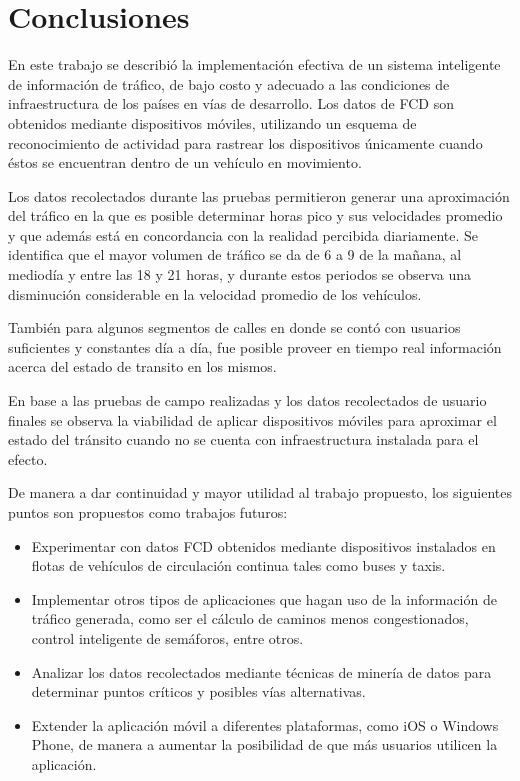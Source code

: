 \section{Conclusiones}
\label{sec:conclusiones}

En este trabajo se describió la implementación efectiva de un sistema inteligente de información de tráfico, de bajo costo y adecuado a las condiciones de infraestructura de los países en vías de desarrollo. Los datos de FCD son obtenidos mediante dispositivos móviles, utilizando un esquema de reconocimiento de actividad para rastrear los dispositivos únicamente cuando éstos se encuentran dentro de un vehículo en movimiento.

Los datos recolectados durante las pruebas permitieron generar una aproximación del tráfico en la que es posible determinar horas pico y sus velocidades promedio y que además está en concordancia con la realidad percibida diariamente. Se identifica que el mayor volumen de tráfico se da de 6 a 9 de la mañana, al mediodía y entre las 18 y 21 horas, y durante estos periodos se observa una disminución considerable en la velocidad promedio de los vehículos.

También para algunos segmentos de calles en donde se contó con usuarios suficientes y constantes día a día, fue posible proveer en tiempo real información acerca del estado de transito en los mismos.

En base a las pruebas de campo realizadas y los datos recolectados de usuario finales se observa la viabilidad de aplicar dispositivos móviles para aproximar el estado del tránsito cuando no se cuenta con infraestructura instalada para el efecto.

De manera a dar continuidad y mayor utilidad al trabajo propuesto, los siguientes puntos son propuestos como trabajos futuros:

\begin{itemize}

\item Experimentar con datos FCD obtenidos mediante dispositivos instalados en flotas de vehículos de circulación continua tales como buses y taxis.


\item Implementar otros tipos de aplicaciones que hagan uso de la información de tráfico generada, como ser el cálculo de caminos menos congestionados, control inteligente de semáforos, entre otros.

\item Analizar los datos recolectados mediante técnicas de minería de datos para determinar puntos críticos y posibles vías alternativas.

\item Extender la aplicación móvil a diferentes plataformas, como iOS o Windows Phone, de manera a aumentar la posibilidad de que más usuarios utilicen la aplicación.

\end{itemize}